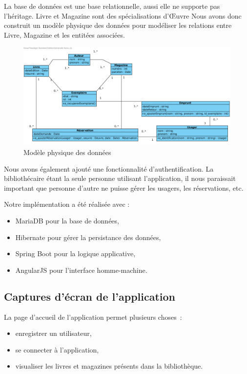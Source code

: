 \documentclass[a4paper,12pt]{article}
\begin{document}
La base de données est une base relationnelle, aussi elle ne supporte pas
l’héritage. Livre et Magazine sont des spécialisations d’Œuvre Nous avons
donc construit un modèle physique des données pour modéliser les relations
entre Livre, Magazine et les entitées associées.

\begin{figure}[htb]
\centering
\includegraphics[width=.9\linewidth]{./res/img/mpd.png}
\caption{\label{fig:orgparagraph8}
Modèle physique des données}
\end{figure}


Nous avons également ajouté une fonctionnalité d’authentification. La
bibliothécaire étant la seule personne utilisant l’application, il nous
paraissait important que personne d’autre ne puisse gérer les usagers, les
réservations, etc.


Notre implémentation a été réalisée avec :
\begin{itemize}
\item MariaDB pour la base de données,
\item Hibernate pour gérer la persistance des données,
\item Spring Boot pour la logique applicative,
\item AngularJS pour l’interface homme-machine.
\end{itemize}



\clearpage

\subsection{Captures d’écran de l’application}
\label{sec:orgheadline18}

La page d’accueil de l’application permet plusieurs choses :
\begin{itemize}
\item enregistrer un utilisateur,
\item se connecter à l’application,
\item visualiser les livres et magazines présents dans la bibliothèque.
\end{itemize}
\end{document}

